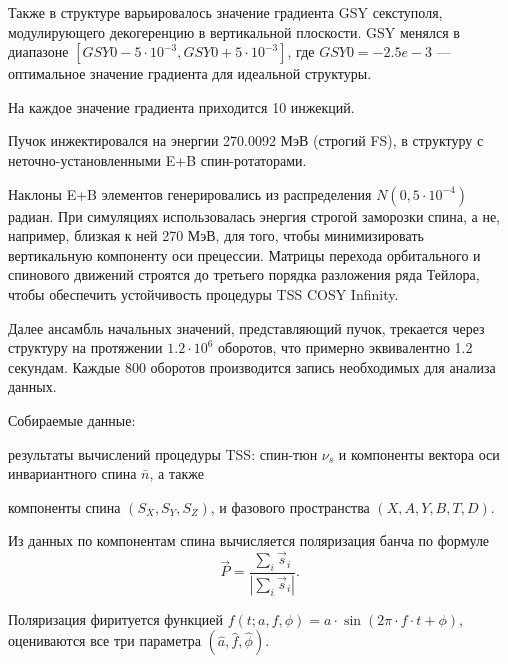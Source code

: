 \documentclass{report}
\begin{document}
Также в структуре варьировалось значение градиента GSY секступоля,
модулирующего декогеренцию в вертикальной плоскости. GSY менялся в
диапазоне $[GSY0 - 5\cdot10^{-3}, GSY0 + 5\cdot10^{-3}]$, где
$GSY0=-2.5e-3$ --- оптимальное значение градиента для идеальной структуры.

На каждое значение градиента приходится 10 инжекций.

Пучок инжектировался на энергии 270.0092 МэВ (строгий FS), в структуру
с неточно-установленными E+B спин-ротаторами. 

Наклоны E+B элементов
генерировались из распределения $N(0, 5\cdot10^{-4})$ радиан. При
симуляциях использовалась энергия строгой заморозки спина, а не,
например, близкая к ней 270 МэВ, для того, чтобы минимизировать
вертикальную компоненту оси прецессии. Матрицы перехода орбитального и спинового движений строятся до  третьего
порядка разложения ряда Тейлора, чтобы обеспечить устойчивость
процедуры TSS COSY Infinity.~\cite{COSYINF:BeamPhysMan}

Далее ансамбль начальных значений, представляющий пучок, трекается
через структуру на протяжении $1.2\cdot10^6$ оборотов, что
примерно эквивалентно 1.2 секундам. Каждые 800 оборотов производится
запись необходимых для анализа данных.

Собираемые данные: 
\begin{inparaenum}
\item результаты вычислений процедуры TSS: спин-тюн $\nu_s$ и компоненты вектора оси инвариантного спина
  $\bar n$, а также
\item компоненты спина $(S_X, S_Y, S_Z)$, и фазового пространства $(X,A,Y,B,T,D)$.
\end{inparaenum}

Из данных по компонентам спина вычисляется поляризация банча по
формуле
\[
\vec P = \frac{\sum_i\vec s_i}{|\sum_i\vec s_i|}.
\]

Поляризация фиритуется функцией $f(t; a,f,\phi) = a\cdot \sin(2\pi\cdot
f\cdot t + \phi)$, оцениваются все три параметра $(\hat a, \hat f,
\hat\phi)$. 
\end{document}
